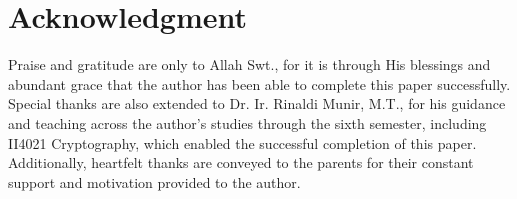 \section*{Acknowledgment}

Praise and gratitude are only to Allah Swt., for it is through His blessings and abundant grace that the author has been able to complete this paper successfully. Special thanks are also extended to Dr. Ir. Rinaldi Munir, M.T., for his guidance and teaching across the author's studies through the sixth semester, including II4021 Cryptography, which enabled the successful completion of this paper. Additionally, heartfelt thanks are conveyed to the parents for their constant support and motivation provided to the author.
